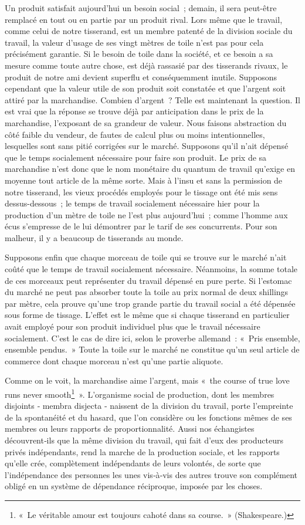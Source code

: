 \documentclass[french,twoside]{book} %
\begin{document}
Un produit satisfait aujourd’hui un besoin social ; demain, il sera peut-être remplacé en tout ou en partie par un produit rival. Lors même que le travail, comme celui de notre tisserand, est un membre patenté de la division sociale du travail, la valeur d’usage de ses vingt mètres de toile n’est pas pour cela précisément garantie. Si le besoin de toile dans la société, et ce besoin a sa mesure comme toute autre chose, est déjà rassasié par des tisserands rivaux, le produit de notre ami devient superflu et conséquemment inutile. Supposons cependant que la valeur utile de son produit soit constatée et que l’argent soit attiré par la marchandise. Combien d’argent ? Telle est maintenant la question. Il est vrai que la réponse se trouve déjà par anticipation dans le prix de la marchandise, l’exposant de sa grandeur de valeur. Nous faisons abstraction du côté faible du vendeur, de fautes de calcul plus ou moins intentionnelles, lesquelles sont sans pitié corrigées sur le marché. Supposons qu’il n’ait dépensé que le temps socialement nécessaire pour faire son produit. Le prix de sa marchandise n’est donc que le nom monétaire du quantum de travail qu’exige en moyenne tout article de la même sorte. Mais à l’insu et sans la permission de notre tisserand, les vieux procédés employés pour le tissage ont été mis sens dessus-dessous ; le temps de travail socialement nécessaire hier pour la production d’un mètre de toile ne l’est plus aujourd’hui ; comme l’homme aux écus s’empresse de le lui démontrer par le tarif de ses concurrents. Pour son malheur, il y a beaucoup de tisserands au monde.\par
Supposons enfin que chaque morceau de toile qui se trouve sur le marché n’ait coûté que le temps de travail socialement nécessaire. Néanmoins, la somme totale de ces morceaux peut représenter du travail dépensé en pure perte. Si l’estomac du marché ne peut pas absorber toute la toile au prix normal de deux shillings par mètre, cela prouve qu’une trop grande partie du travail social a été dépensée sous forme de tissage. L’effet est le même que si chaque tisserand en particulier avait employé pour son produit individuel plus que le travail nécessaire socialement. C’est le cas de dire ici, selon le proverbe allemand : « Pris ensemble, ensemble pendus. » Toute la toile sur le marché ne constitue qu’un seul article de commerce dont chaque morceau n’est qu’une partie aliquote.\par
Comme on le voit, la marchandise aime l’argent, mais « the course of true love runs never smooth\footnote{« Le véritable amour est toujours cahoté dans sa course. » (Shakespeare.)} ». L’organisme social de production, dont les membres disjoints ‑ membra disjecta ‑ naissent de la division du travail, porte l’empreinte de la spontanéité et du hasard, que l’on considère ou les fonctions mêmes de ses membres ou leurs rapports de proportionnalité. Aussi nos échangistes découvrent‑ils que la même division du travail, qui fait d’eux des producteurs privés indépendants, rend la marche de la production sociale, et les rapports qu’elle crée, complètement indépendants de leurs volontés, de sorte que l’indépendance des personnes les unes vis‑à‑vis des autres trouve son complément obligé en un système de dépendance réciproque, imposée par les choses.\par
\end{document}
